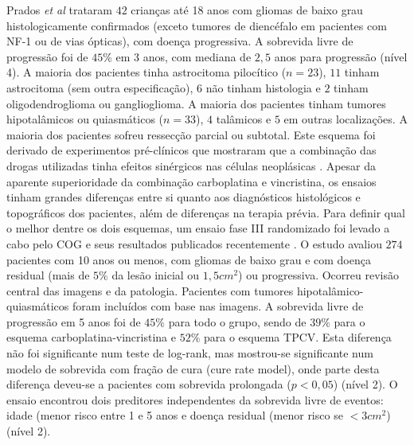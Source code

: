 \documentclass[11pt,a4paper,oldfontcommands]{memoir}
\begin{document}
Prados \textit{et al}  trataram \(42\) crianças até 18 anos com gliomas de baixo grau histologicamente confirmados (exceto tumores de diencéfalo em pacientes com NF-1 ou de vias ópticas), com doença progressiva. A sobrevida livre de progressão foi de \(45\%\) em 3 anos, com mediana de \(2,5\) anos para progressão (nível 4). A maioria dos pacientes tinha astrocitoma pilocítico (\(n=23\)), \(11\) tinham astrocitoma (sem outra especificação), \(6\) não tinham histologia e \(2\) tinham oligodendroglioma ou ganglioglioma. A maioria dos pacientes tinham tumores hipotalâmicos ou quiasmáticos (\(n=33\)), \(4\) talâmicos e \(5\) em outras localizações. A maioria dos pacientes sofreu ressecção parcial ou subtotal. Este esquema foi derivado de experimentos pré-clínicos que mostraram que a combinação das drogas utilizadas tinha efeitos sinérgicos nas células neoplásicas \cite{prados}. Apesar da aparente superioridade da combinação carboplatina e vincristina, os ensaios tinham grandes diferenças entre si quanto aos diagnósticos histológicos e topográficos dos pacientes, além de diferenças na terapia prévia. Para definir qual o melhor dentre os dois esquemas, um ensaio fase III randomizado foi levado a cabo pelo COG e seus resultados publicados recentemente \cite{Ater20072012}. O estudo avaliou \(274\) pacientes com 10 anos ou menos, com gliomas de baixo grau e com doença residual (mais de \(5\%\) da lesão inicial ou \(1,5 cm^2\)) ou progressiva. Ocorreu revisão central das imagens e da patologia. Pacientes com tumores hipotalâmico-quiasmáticos foram incluídos com base nas imagens. A sobrevida livre de progressão em 5 anos foi de \(45\%\) para todo o grupo, sendo de \(39\%\) para o esquema carboplatina-vincristina e \(52\%\) para o esquema TPCV. Esta diferença não foi significante num teste de log-rank, mas mostrou-se significante num modelo de sobrevida com fração de cura (cure rate model), onde parte desta diferença deveu-se a pacientes com sobrevida prolongada (\(p<0,05\)) (nível 2). O ensaio encontrou dois preditores independentes da sobrevida livre de eventos: idade (menor risco entre 1 e 5 anos e doença residual (menor risco se \(<3 cm^2\)) (nível 2).
\end{document}
